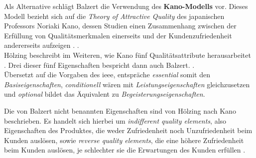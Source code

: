 Als Alternative schlägt Balzert die Verwendung des \textbf{Kano-Modells} vor. Dieses Modell bezieht sich auf die \textit{Theory of Attractive Quality} des japanischen Professors Noriaki Kano, dessen Studien einen Zusammenhang zwischen der Erfüllung von Qualitätsmerkmalen einerseits und der Kundenzufriedenheit andererseits aufzeigen \citep[vgl.][77]{Hoelzing2008}. 
 \citep[][78]{Hoelzing2008}. \\
Hölzing beschreibt im Weiteren, wie Kano fünf Qualitätsattribute herausarbeitet \citep[vgl.][82]{Hoelzing2008}. Drei dieser fünf Eigenschaften bespricht dann auch Balzert.
 \citep[][544]{Balzert2010}.\\
Übersetzt auf die Vorgaben des \ac{ieee}, entspräche \textit{essential} somit den \textit{Basiseigenschaften}, \textit{conditionell} wären mit \textit{Leistungseigenschaften} gleichzusetzen und \textit{optional} bildet das Äquivalent zu \textit{Begeisterungseigenschaften}.

Die von Balzert nicht benannten Eigenschaften sind von Hölzing nach Kano beschrieben. Es handelt sich hierbei um \textit{indifferent quality elements}, also Eigenschaften des Produktes, die weder Zufriedenheit noch Unzufriedenheit beim Kunden auslösen, sowie \textit{reverse quality elements}, die eine höhere Zufriedenheit beim Kunden auslösen, je schlechter sie die Erwartungen des Kunden erfüllen \citep[vgl.][83]{Hoelzing2008}.

